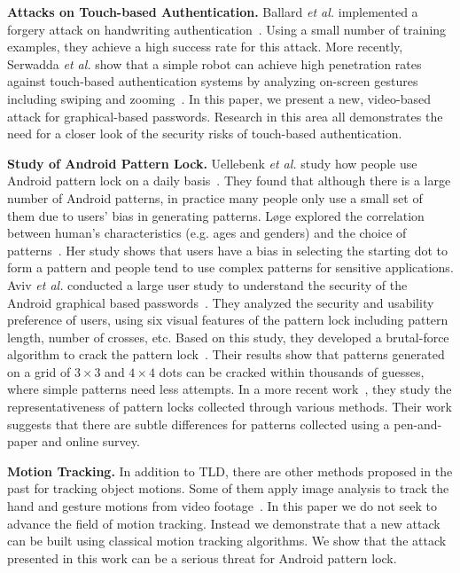 \vspace{2mm}
\noindent \textbf{Attacks on Touch-based Authentication.}
Ballard \emph{et al.} implemented a forgery attack on handwriting
authentication~\cite{ballard2007forgery}. Using a small number of training
examples, they achieve a high success rate for this attack. More recently,
Serwadda \emph{et al.} show that a simple robot can achieve high penetration
rates against touch-based authentication systems by analyzing on-screen gestures including
swiping and zooming~\cite{serwadda2013kids}.
In this paper, we present a new, video-based attack for graphical-based passwords.
Research in this area all demonstrates the need for a closer look of the security risks of touch-based authentication.


\vspace{2mm}
\noindent \textbf{Study of Android Pattern Lock.}
Uellebenk \emph{et al.} study how people use Android pattern lock on
a daily basis~\cite{uellenbeck2013quantifying}.  They found that although there
is a large number of Android patterns, in
practice many people only use a small set of them due to users' bias in
generating patterns. L{\o}ge explored the correlation between
human's characteristics (e.g. ages and genders) and the choice of
patterns~\cite{alpnorway}. Her study shows that users have a bias in selecting the
starting dot to form a pattern and people tend to use complex patterns
for sensitive applications.
Aviv \emph{et al.} conducted a large user study to understand the security of the Android graphical based passwords~\cite{Aviv2014Understanding}. They analyzed the security and usability preference of users, using six visual features of the pattern lock including pattern length, number of crosses, etc.
Based on this study, they developed a brutal-force  algorithm to
crack the pattern lock~\cite{Aviv2015Is}. Their results show that patterns
generated on a grid of $3\times3$ and $4\times4$ dots can be cracked
within thousands of guesses, where simple patterns need less
attempts. In a more recent work~\cite{Aviv2016Anlyzing}, they study the representativeness of
pattern locks collected through various methods. Their work suggests
that there are subtle differences for patterns collected using a pen-and-paper
 and online survey.

\vspace{2mm}
\noindent \textbf{Motion Tracking.} In addition to TLD, there are other methods proposed in the past for tracking object
motions. Some of them apply image analysis to track the hand and gesture
motions from video
footage~\cite{Yang:2002:EMT:605089.605095,Stenger:2006:MHT:1159166.1159342,
citeulike:13091082}. In this paper we do not seek to advance the field of
motion tracking. Instead we demonstrate that a new attack can be built
using classical motion tracking algorithms. We show that the attack presented in
this work can be a serious threat for Android pattern lock. %

